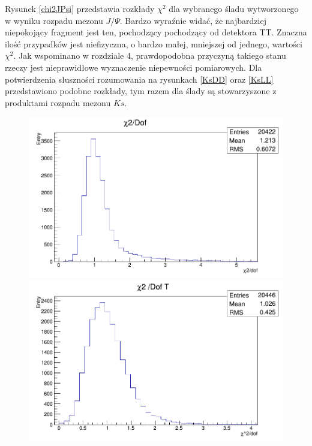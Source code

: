 Rysunek \ref{chi2JPsi} przedstawia rozkłady $\chi^2$ dla wybranego śladu wytworzonego w wyniku rozpadu mezonu $J/ \Psi$.  Bardzo wyraźnie widać, że najbardziej niepokojący fragment jest ten, pochodzący pochodzący od detektora TT. Znaczna ilość przypadków jest niefizyczna, o bardzo małej, mniejszej od jednego, wartości $\chi^2$. Jak wspominano w rozdziale 4, prawdopodobna przyczyną takiego stanu rzeczy jest nieprawidłowe wyznaczenie niepewności pomiarowych. Dla potwierdzenia słuszności rozumowania na rysunkach \ref{KsDD} oraz \ref{KsLL} przedstawiono  podobne rozkłady, tym razem dla ślady są stowarzyszone z produktami rozpadu mezonu $Ks$.
\begin{figure}[h]    
\begin{minipage}[t]{0.45\textwidth}
\includegraphics[width=\linewidth]{rozdzial6/KsLL_chi2.png}
\end{minipage}
\hspace{\fill}
\begin{minipage}[t]{0.45\textwidth}
\includegraphics[width=\linewidth]{rozdzial6/KsLL_chi2T.png}
\end{minipage}


\end{figure}
